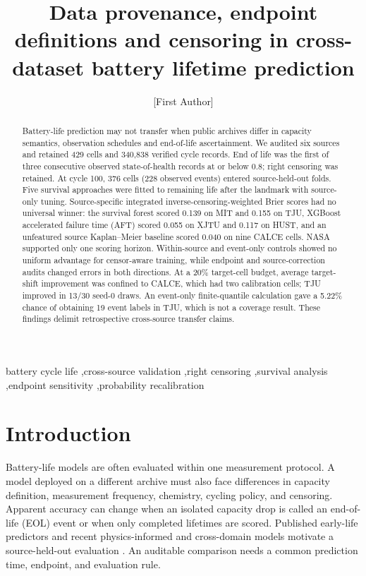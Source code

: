 \documentclass[preprint,12pt]{elsarticle}
\begin{document}
\begin{frontmatter}
\title{Data provenance, endpoint definitions and censoring in cross-dataset battery lifetime prediction}
\author[aff1]{[First Author]}

\begin{abstract}
Battery-life prediction may not transfer when public archives differ in capacity semantics, observation schedules and end-of-life ascertainment. We audited six sources and retained 429 cells and 340,838 verified cycle records. End of life was the first of three consecutive observed state-of-health records at or below 0.8; right censoring was retained. At cycle 100, 376 cells (228 observed events) entered source-held-out folds. Five survival approaches were fitted to remaining life after the landmark with source-only tuning. Source-specific integrated inverse-censoring-weighted Brier scores had no universal winner: the survival forest scored 0.139 on MIT and 0.155 on TJU, XGBoost accelerated failure time (AFT) scored 0.055 on XJTU and 0.117 on HUST, and an unfeatured source Kaplan--Meier baseline scored 0.040 on nine CALCE cells. NASA supported only one scoring horizon. Within-source and event-only controls showed no uniform advantage for censor-aware training, while endpoint and source-correction audits changed errors in both directions. At a 20\% target-cell budget, average target-shift improvement was confined to CALCE, which had two calibration cells; TJU improved in 13/30 seed-0 draws. An event-only finite-quantile calculation gave a 5.22\% chance of obtaining 19 event labels in TJU, which is not a coverage result. These findings delimit retrospective cross-source transfer claims.
\end{abstract}
\begin{keyword}
battery cycle life \sep cross-source validation \sep right censoring \sep survival analysis \sep endpoint sensitivity \sep probability recalibration
\end{keyword}
\end{frontmatter}

\section{Introduction}
Battery-life models are often evaluated within one measurement protocol. A model deployed on a different archive must also face differences in capacity definition, measurement frequency, chemistry, cycling policy, and censoring. Apparent accuracy can change when an isolated capacity drop is called an end-of-life (EOL) event or when only completed lifetimes are scored. Published early-life predictors and recent physics-informed and cross-domain models motivate a source-held-out evaluation \citep{severson2019,wang2024pin,tang2024ae,ledeng2026,zhu2026lake}. An auditable comparison needs a common prediction time, endpoint, and evaluation rule.
\end{document}
